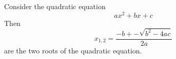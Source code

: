 \documentclass{article}
\begin{document}
  Consider the quadratic equation
  \begin{equation}
    a x^2 + b x + c
  \end{equation}
  Then 
  \begin{equation}
    \label{eq:quad}
    x_{1,2} = \frac{-b+-\sqrt{b^2-4ac}}{2a}
  \end{equation}
  are the two roots of the quadratic equation.
\end{document}
